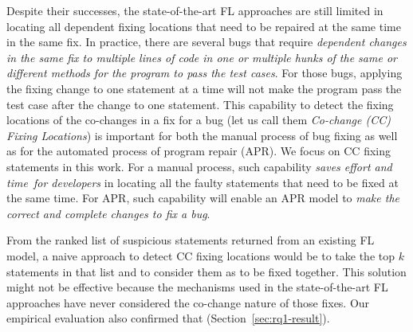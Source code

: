 Despite their successes, the state-of-the-art FL approaches are still
limited in locating all dependent fixing locations that need to be
repaired at the same time in the same fix. In practice, there are
several bugs that require {\em dependent changes in the same fix to
  multiple lines of code in one or multiple hunks of the same or
  different methods for the program to pass the test cases}.
For those bugs, applying the fixing change to one statement at a time
will not make the program pass the test case after the change to one
statement. This capability to detect the fixing locations of the
co-changes in a fix for a bug (let us call them {\em Co-change (CC)
  Fixing Locations}) is important for both the manual process of bug
fixing as well as for the automated process of program repair
(APR). We focus on CC fixing statements in this work. For a manual
process, such capability {\em saves effort and time~for developers} in
locating all the faulty statements that need to be fixed at the same
time. For APR, such capability will enable an APR model to {\em
make the correct and complete changes to fix a bug}.


From the ranked list of suspicious statements returned from an
existing FL model, a naive approach to detect CC fixing locations would
be to take the top $k$ statements in that list and to consider them as
to be fixed together. This solution might not be effective
because the mechanisms used in the state-of-the-art FL approaches have
never considered the co-change nature of those fixes. Our empirical
evaluation also confirmed that (Section~\ref{sec:rq1-result}).

